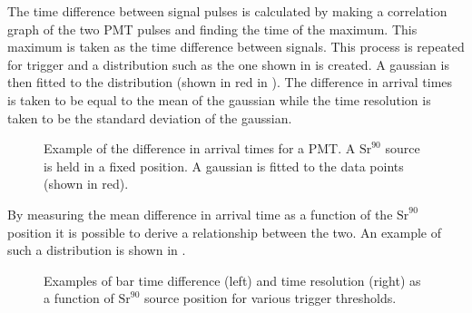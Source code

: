 The time difference between signal pulses is calculated by making a correlation graph of the two PMT pulses and finding the time of the maximum.
This maximum is taken as the time difference between signals.
This process is repeated for trigger and a distribution such as the one shown in  is created.
A gaussian is then fitted to the distribution (shown in red in ).
The difference in arrival times is taken to be equal to the mean of the gaussian while the time resolution is taken to be the standard deviation of the gaussian.

\begin{figure}[h]
  \begin{adjustbox}{max totalsize={.8\textwidth}, center}
    
  \end{adjustbox}
  \caption[Example of difference in signal arrival times for a PMT]{Example of the difference in arrival times for a PMT. A $\text{Sr}^{90}$ source is held in a fixed position. A gaussian is fitted to the data points (shown in red).}
  \label{fig:deltaTEx}
\end{figure}

By measuring the mean difference in arrival time as a function of the $\text{Sr}^{90}$ position it is possible to derive a relationship between the two.
An example of such a distribution is shown in .

\begin{figure}[h]
  \begin{minipage}[t]{.5\textwidth}
    \begin{adjustbox}{max totalsize={\textwidth}, center}
      
    \end{adjustbox}
  \end{minipage}
  \hfill
  \begin{minipage}[t]{.5\textwidth}
    \begin{adjustbox}{max totalsize={\textwidth}, center}
      
    \end{adjustbox}
  \end{minipage}
  \caption[Examples of bar time difference and time resolution as a function of source position]{Examples of bar time difference (left) and time resolution (right) as a function of $\text{Sr}^{90}$ source position for various trigger thresholds.}
  \label{fig:barTimeDiffRes}
\end{figure}



